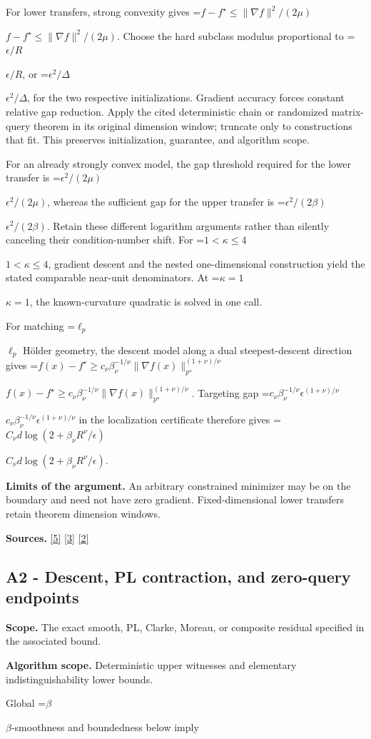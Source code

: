\documentclass[10pt,a4paper]{article}
\newcommand{\AtlasMath}[1]{\par\begingroup\centering\setbox0=\hbox{$\displaystyle #1$}\ifdim\wd0>1.4\linewidth\typeout{ATLAS WIDE FORMULA: \the\wd0}\fi\ifdim\wd0>\linewidth\resizebox{\linewidth}{!}{\box0}\else\box0\fi\par\endgroup}
\newcommand{\AtlasInlineMath}[1]{\begingroup\setbox0=\hbox{$#1$}\ifdim\wd0>.4\linewidth\endgroup\AtlasMath{#1}\else\endgroup$#1$\fi}
\begin{document}
For lower transfers, strong convexity gives \AtlasInlineMath{f-f^\star\le\|\nabla f\|^2/(2\mu)}. Choose the hard subclass modulus proportional to \AtlasInlineMath{\epsilon/R}, or \AtlasInlineMath{\epsilon^2/\Delta}, for the two respective initializations. Gradient accuracy forces constant relative gap reduction. Apply the cited deterministic chain or randomized matrix-query theorem in its original dimension window; truncate only to constructions that fit. This preserves initialization, guarantee, and algorithm scope.

For an already strongly convex model, the gap threshold required for the lower transfer is \AtlasInlineMath{\epsilon^2/(2\mu)}, whereas the sufficient gap for the upper transfer is \AtlasInlineMath{\epsilon^2/(2\beta)}. Retain these different logarithm arguments rather than silently canceling their condition-number shift. For \AtlasInlineMath{1<\kappa\le4}, gradient descent and the nested one-dimensional construction yield the stated comparable near-unit denominators. At \AtlasInlineMath{\kappa=1}, the known-curvature quadratic is solved in one call.

For matching \AtlasInlineMath{\ell_p} Hölder geometry, the descent model along a dual steepest-descent direction gives
\AtlasInlineMath{f(x)-f^\star\ge c_\nu\beta_\nu^{-1/\nu}\|\nabla f(x)\|_{p^\star}^{(1+\nu)/\nu}}.
Targeting gap \AtlasInlineMath{c_\nu\beta_\nu^{-1/\nu}\epsilon^{(1+\nu)/\nu}} in the localization certificate therefore gives
\AtlasInlineMath{C_\nu d\log(2+\beta_\nu R^\nu/\epsilon)}.

\textbf{Limits of the argument.} An arbitrary constrained minimizer may be on the boundary and need not have zero gradient. Fixed-dimensional lower transfers retain theorem dimension windows.

\textbf{Sources.} \href{https://arxiv.org/pdf/2101.09740v2}{[5]} \href{https://arxiv.org/pdf/2609.33360v2}{[3]} \href{https://arxiv.org/pdf/2609.10874}{[2]}

\subsection{A2 - Descent, PL contraction, and zero-query endpoints}
\textbf{Scope.} The exact smooth, PL, Clarke, Moreau, or composite residual specified in the associated bound.

\textbf{Algorithm scope.} Deterministic upper witnesses and elementary indistinguishability lower bounds.

Global \AtlasInlineMath{\beta}-smoothness and boundedness below imply
\end{document}
